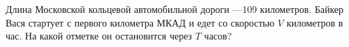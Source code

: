 Длина Московской кольцевой автомобильной дороги ---109 километров. Байкер Вася стартует с первого километра МКАД и едет со скоростью $V$ километров в час. На какой отметке он остановится через $T$ часов?